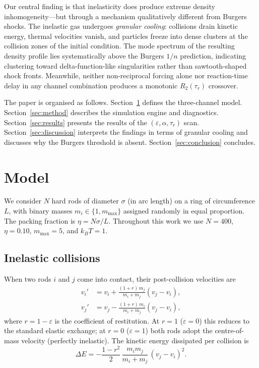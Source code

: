 \documentclass[aps,pre,twocolumn,superscriptaddress,longbibliography,floatfix]{revtex4-2}
\begin{document}
Our central finding is that inelasticity does produce extreme
density inhomogeneity---but through a mechanism qualitatively
different from Burgers shocks. The inelastic gas undergoes
\emph{granular cooling}: collisions drain kinetic energy, thermal
velocities vanish, and particles freeze into dense clusters at the
collision zones of the initial condition. The mode spectrum of the
resulting density profile lies systematically above the Burgers
$1/n$ prediction, indicating clustering toward delta-function-like
singularities rather than sawtooth-shaped shock fronts. Meanwhile,
neither non-reciprocal forcing alone nor reaction-time delay in
any channel combination produces a monotonic $R_2(\tau_r)$
crossover.

The paper is organised as follows. Section~\ref{sec:model}
defines the three-channel model. Section~\ref{sec:method}
describes the simulation engine and diagnostics.
Section~\ref{sec:results} presents the results of the
$(\varepsilon, \alpha, \tau_r)$ scan.
Section~\ref{sec:discussion} interprets the findings in terms of
granular cooling and discusses why the Burgers threshold is
absent. Section~\ref{sec:conclusion} concludes.

\section{Model}
\label{sec:model}

We consider $N$ hard rods of diameter $\sigma$ (in arc length) on
a ring of circumference $L$, with binary masses $m_i \in \{1,
m_{\max}\}$ assigned randomly in equal proportion. The packing
fraction is $\eta = N\sigma/L$. Throughout this work we use $N =
400$, $\eta = 0.10$, $m_{\max} = 5$, and $k_BT = 1$.

\subsection{Inelastic collisions}
\label{sec:inelastic}

When two rods $i$ and $j$ come into contact, their post-collision
velocities are
\begin{align}
v_i' &= v_i + \frac{(1+r)\,m_j}{m_i + m_j}(v_j - v_i), \label{eq:coll_i}\\
v_j' &= v_j - \frac{(1+r)\,m_i}{m_i + m_j}(v_j - v_i), \label{eq:coll_j}
\end{align}
where $r = 1 - \varepsilon$ is the coefficient of restitution.
At $r = 1$ ($\varepsilon = 0$) this reduces to the standard
elastic exchange; at $r = 0$ ($\varepsilon = 1$) both rods adopt
the centre-of-mass velocity (perfectly inelastic). The kinetic
energy dissipated per collision is
\begin{equation}
\Delta E = -\frac{1-r^2}{2}\,\frac{m_i m_j}{m_i + m_j}\,(v_j - v_i)^2.
\label{eq:DeltaE}
\end{equation}
\end{document}
